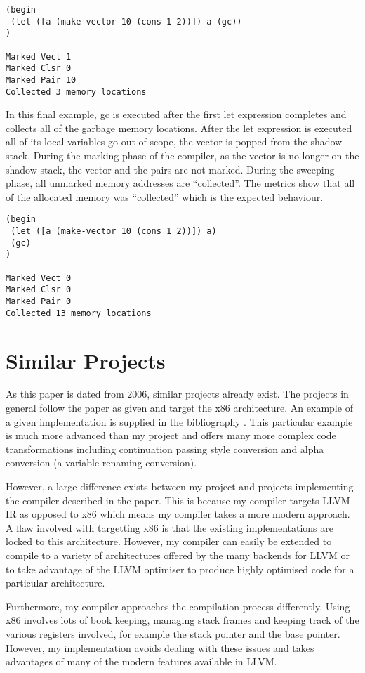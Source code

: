 \documentclass{article}
\begin{document}
\begin{verbatim}
(begin 
 (let ([a (make-vector 10 (cons 1 2))]) a (gc))
)

Marked Vect 1
Marked Clsr 0
Marked Pair 10
Collected 3 memory locations
\end{verbatim}

In this final example, gc is executed after the first let expression completes and collects all of the garbage memory locations. After the let expression is executed all of its local variables go out of scope, the vector is popped from the shadow stack. During the marking phase of the compiler, as the vector is no longer on the shadow stack, the vector and the pairs are not marked. During the sweeping phase, all unmarked memory addresses are ``collected''. The metrics show that all of the allocated memory was ``collected'' which is the expected behaviour.

\begin{verbatim}
(begin 
 (let ([a (make-vector 10 (cons 1 2))]) a)
 (gc)
)

Marked Vect 0
Marked Clsr 0
Marked Pair 0
Collected 13 memory locations
\end{verbatim}

\section{Similar Projects}

As this paper is dated from 2006, similar projects already exist. The projects in general follow the paper as given and target the x86 architecture. An example of a given implementation is supplied in the bibliography \cite{namin}. This particular example is much more advanced than my project and offers many more complex code transformations including continuation passing style conversion and alpha conversion (a variable renaming conversion).

However, a large difference exists between my project and projects implementing the compiler described in the paper. This is because my compiler targets LLVM IR as opposed to x86 which means my compiler takes a more modern approach. A flaw involved with targetting x86 is that the existing implementations are locked to this architecture. However, my compiler can easily be extended to compile to a variety of architectures offered by the many backends for LLVM or to take advantage of the LLVM optimiser to produce highly optimised code for a particular architecture. 

Furthermore, my compiler approaches the compilation process differently. Using x86 involves lots of book keeping, managing stack frames and keeping track of the various registers involved, for example the stack pointer and the base pointer. However, my implementation avoids dealing with these issues and takes advantages of many of the modern features available in LLVM.
\end{document}

